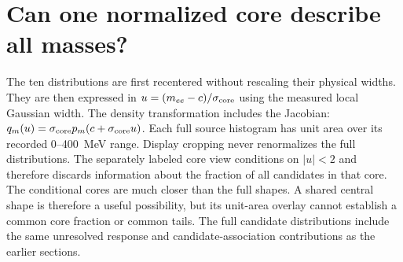 \section{Can one normalized core describe all masses?}
The ten distributions are first recentered without rescaling their
physical widths. They are then expressed in
$u=(m_{ee}-c)/\sigma_{\rm core}$ using the measured local Gaussian width.
The density transformation includes the Jacobian:
$q_m(u)=\sigma_{\rm core}p_m(c+\sigma_{\rm core}u)$.
Each full source histogram has unit area over its recorded 0--400~MeV
range. Display cropping never renormalizes the full distributions.
The separately labeled core view conditions on $|u|<2$ and therefore
discards information about the fraction of all candidates in that core.
The conditional cores are much closer than the full shapes. A shared
central shape is therefore a useful possibility, but its unit-area
overlay cannot establish a common core fraction or common tails. The
full candidate distributions include the same unresolved response and
candidate-association contributions as the earlier sections.

\clearpage
